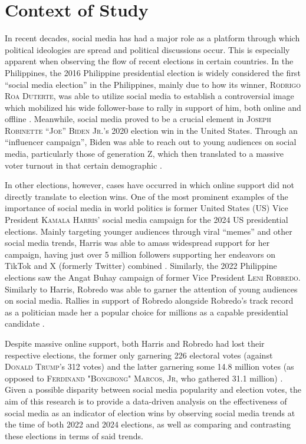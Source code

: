 
\section{Context of Study}
In recent decades, social media has had a major role as a platform through which political ideologies are spread and political discussions occur. This is especially apparent when observing the flow of recent elections in certain countries. In the Philippines, the 2016 Philippine presidential election is widely considered the first “social media election” in the Philippines, mainly due to how its winner, \textsc{Rodrigo Roa Duterte}, was able to utilize social media to establish a controversial image which mobilized his wide follower-base to rally in support of him, both online and offline \cite{RRL_Sinpeng-2020}. Meanwhile, social media proved to be a crucial element in \textsc{Joseph Robinette “Joe” Biden Jr.}’s 2020 election win in the United States. Through an “influencer campaign”, Biden was able to reach out to young audiences on social media, particularly those of generation Z, which then translated to a massive voter turnout in that certain demographic \cite{CTX_Suciu-2020}.

In other elections, however, cases have occurred in which online support did not directly translate to election wins. One of the most prominent examples of the importance of social media in world politics is former United States (US) Vice President \textsc{Kamala Harris}’ social media campaign for the 2024 US presidential elections. Mainly targeting younger audiences through viral “memes” and other social media trends, Harris was able to amass widespread support for her campaign, having just over 5 million followers supporting her endeavors on TikTok and X (formerly Twitter) combined \cite{CTX_Lee-2024}. Similarly, the 2022 Philippine elections saw the Angat Buhay campaign of former Vice President \textsc{Leni Robredo}. Similarly to Harris, Robredo was able to garner the attention of young audiences on social media. Rallies in support of Robredo alongside Robredo’s track record as a politician made her a popular choice for millions as a capable presidential candidate \cite{CTX_Johnson-2022}.

Despite massive online support, both Harris and Robredo had lost their respective elections, the former only garnering 226 electoral votes (against \textsc{Donald Trump}’s 312 votes) and the latter garnering some 14.8 million votes (as opposed to \textsc{Ferdinand "Bongbong" Marcos, Jr}, who gathered 31.1 million) \cite{CTX_ABSCBN-2022,CTX_BBC-2024}. Given a possible disparity between social media popularity and election votes, the aim of this research is to provide a data-driven analysis on the effectiveness of social media as an indicator of election wins by observing social media trends at the time of both 2022 and 2024 elections, as well as comparing and contrasting these elections in terms of said trends.

